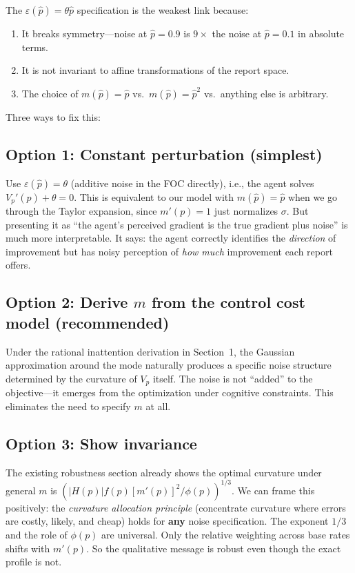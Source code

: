 \documentclass[11pt]{article}
\begin{document}
The $\varepsilon(\hat{p}) = \theta\hat{p}$ specification is the weakest link because:
\begin{enumerate}
\item It breaks symmetry---noise at $\hat{p} = 0.9$ is $9\times$ the noise at $\hat{p} = 0.1$ in absolute terms.
\item It is not invariant to affine transformations of the report space.
\item The choice of $m(\hat{p}) = \hat{p}$ vs.\ $m(\hat{p}) = \hat{p}^2$ vs.\ anything else is arbitrary.
\end{enumerate}

Three ways to fix this:

\subsection{Option 1: Constant perturbation (simplest)}

Use $\varepsilon(\hat{p}) = \theta$ (additive noise in the FOC directly), i.e., the agent solves $V_p'(\hat{p}) + \theta = 0$. This is equivalent to our model with $m(\hat{p}) = \hat{p}$ when we go through the Taylor expansion, since $m'(p) = 1$ just normalizes $\sigma$. But presenting it as ``the agent's perceived gradient is the true gradient plus noise'' is much more interpretable. It says: the agent correctly identifies the \emph{direction} of improvement but has noisy perception of \emph{how much} improvement each report offers.

\subsection{Option 2: Derive $m$ from the control cost model (recommended)}

Under the rational inattention derivation in Section~1, the Gaussian approximation around the mode naturally produces a specific noise structure determined by the curvature of $V_p$ itself. The noise is not ``added'' to the objective---it emerges from the optimization under cognitive constraints. This eliminates the need to specify $m$ at all.

\subsection{Option 3: Show invariance}

The existing robustness section already shows the optimal curvature under general $m$ is $(|H(p)| f(p) [m'(p)]^2 / \phi(p))^{1/3}$. We can frame this positively: the \emph{curvature allocation principle} (concentrate curvature where errors are costly, likely, and cheap) holds for \textbf{any} noise specification. The exponent $1/3$ and the role of $\phi(p)$ are universal. Only the relative weighting across base rates shifts with $m'(p)$. So the qualitative message is robust even though the exact profile is not.
\end{document}
